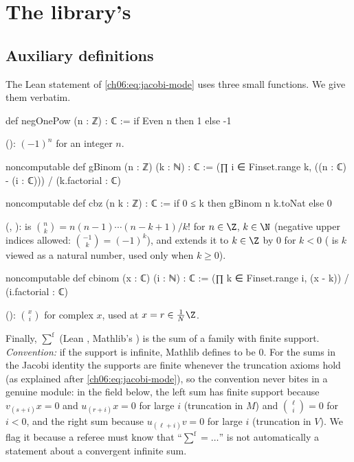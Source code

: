 \section{The library's \texorpdfstring{}{TwistedModule}}\label{ch06:sec:tm}

\subsection{Auxiliary definitions}

The Lean statement of \eqref{ch06:eq:jacobi-mode} uses three small functions.  We give them
verbatim.
\begin{leancode}
def negOnePow (n : ℤ) : ℂ := if Even n then 1 else -1
\end{leancode}
(): $(-1)^n$ for an integer $n$.
\begin{leancode}
noncomputable def gBinom (n : ℤ) (k : ℕ) : ℂ :=
  (∏ i ∈ Finset.range k, ((n : ℂ) - (i : ℂ))) / (k.factorial : ℂ)

noncomputable def cbz (n k : ℤ) : ℂ := if 0 ≤ k then gBinom n k.toNat else 0
\end{leancode}
(, ):
 is $\binom nk=n(n-1)\cdots(n-k+1)/k!$ for $n\in\Z$, $k\in\N$ (negative upper
indices allowed: $\binom{-1}{k}=(-1)^k$), and  extends it to $k\in\Z$ by $0$ for
$k<0$ ( is $k$ viewed as a natural number, used only when $k\ge0$).
\begin{leancode}
noncomputable def cbinom (x : ℂ) (i : ℕ) : ℂ :=
  (∏ k ∈ Finset.range i, (x - k)) / (i.factorial : ℂ)
\end{leancode}
(): $\binom xi$ for complex $x$, used at $x=r\in\frac1N\Z$.

Finally, $\sum^{\mathrm f}$ (Lean , Mathlib's ) is the sum of a family with
finite support.  \emph{Convention:} if the support is infinite, Mathlib defines  to be
$0$.  For the sums in the Jacobi identity the supports are finite whenever the truncation axioms
hold (as explained after \eqref{ch06:eq:jacobi-mode}), so the convention never bites in a genuine
module: in the field  below, the left sum has finite support because
$v_{(s+i)}x=0$ and $u_{(r+i)}x=0$ for large $i$ (truncation in $M$) and $\binom\ell i=0$ for
$i<0$, and the right sum because $u_{(\ell+i)}v=0$ for large $i$ (truncation in $V$).  We flag it because a referee must know that ``$\sum^{\mathrm f}=\dots$'' is not
automatically a statement about a convergent infinite sum.

